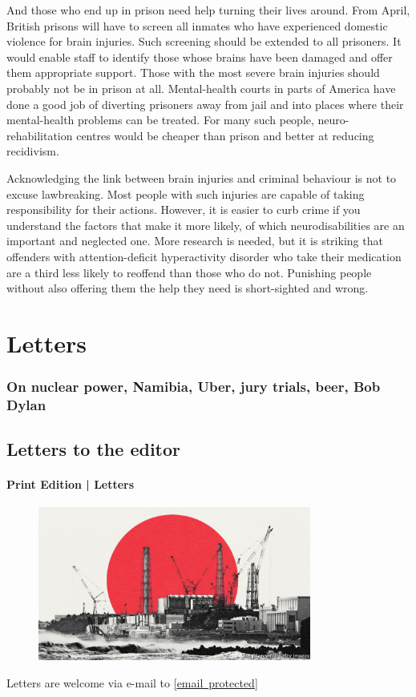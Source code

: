 \documentclass{article}
\begin{document}
And those who end up in prison need help turning their lives around. From April, British prisons will have to screen all inmates who have experienced domestic violence for brain injuries. Such screening should be extended to all prisoners. It would enable staff to identify those whose brains have been damaged and offer them appropriate support. Those with the most severe brain injuries should probably not be in prison at all. Mental-health courts in parts of America have done a good job of diverting prisoners away from jail and into places where their mental-health problems can be treated. For many such people, neuro-rehabilitation centres would be cheaper than prison and better at reducing recidivism. 

Acknowledging the link between brain injuries and criminal behaviour is not to excuse lawbreaking. Most people with such injuries are capable of taking responsibility for their actions. However, it is easier to curb crime if you understand the factors that make it more likely, of which neurodisabilities are an important and neglected one. More research is needed, but it is striking that offenders with attention-deficit hyperactivity disorder who take their medication are a third less likely to reoffend than those who do not. Punishing people without also offering them the help they need is short-sighted and wrong. {} 
\clearpage
\section{Letters }
\subsubsection{On nuclear power, Namibia, Uber, jury trials, beer, Bob Dylan }
\subsection{Letters to the editor }
\paragraph{Print Edition | Letters  \quad \color{gray}{Mar 27th 2021 }}
\begin{figure}[h]
\centering
\includegraphics[width=0.8\textwidth]{images/20210306_ldd002.jpg}
\end{figure}
{{{{Letters are welcome via e-mail to }\href{/cdn-cgi/l/email-protection\#81ede4f5f5e4f3f2c1e4e2eeefeeece8f2f5afe2eeec}{{{[}email~protected{]}}}}}} 
\end{document}
